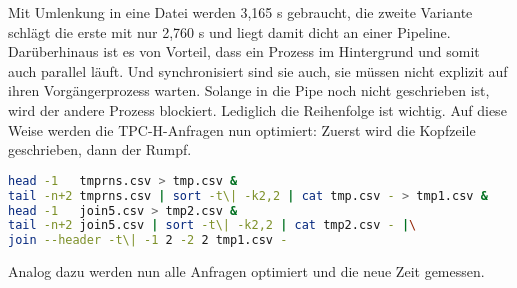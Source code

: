 Mit Umlenkung in eine Datei werden 3,165 s gebraucht, die zweite Variante schlägt die erste mit nur 2,760 s und liegt damit dicht an einer Pipeline.
Darüberhinaus ist es von Vorteil, dass ein Prozess im Hintergrund und somit auch parallel läuft. Und synchronisiert sind sie auch, sie müssen nicht explizit auf ihren Vorgängerprozess warten. Solange in die Pipe noch nicht geschrieben ist, wird der andere Prozess blockiert. Lediglich die Reihenfolge ist wichtig. Auf diese Weise werden die TPC-H-Anfragen nun optimiert: Zuerst wird die Kopfzeile geschrieben, dann der Rumpf.
\begin{lstlisting}[language=Bash]
head -1   tmprns.csv > tmp.csv &
tail -n+2 tmprns.csv | sort -t\| -k2,2 | cat tmp.csv - > tmp1.csv &
head -1   join5.csv > tmp2.csv &
tail -n+2 join5.csv | sort -t\| -k2,2 | cat tmp2.csv - |\
join --header -t\| -1 2 -2 2 tmp1.csv -
\end{lstlisting}

Analog dazu werden nun alle Anfragen optimiert und die neue Zeit gemessen.


